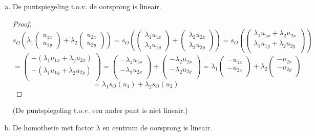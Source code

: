 \documentclass[lineaire_algebra_oplossingen.tex]{subfiles}
\begin{document}
\begin{enumerate}
\begin{enumerate}[a)]
\item De puntspiegeling t.o.v. de oorsprong is lineair.
\begin{proof}
\[
s_O \left(\lambda_1
\begin{pmatrix}
u_{1x}\\u_{1y}
\end{pmatrix} 
+ \lambda_2
\begin{pmatrix}
u_{2x}\\u_{2y}
\end{pmatrix} \right)
 = 
s_O \left(
\begin{pmatrix}
\lambda_1u_{1x}\\\lambda_1u_{1y}
\end{pmatrix} 
+ 
\begin{pmatrix}
\lambda_2u_{2x}\\\lambda_2u_{2y}
\end{pmatrix} \right)
=
s_O \left(
\begin{pmatrix}
\lambda_1u_{1x}+\lambda_2u_{2x}\\\lambda_1u_{1y}+\lambda_2u_{2y}\\
\end{pmatrix} \right)
\]
\[
= 
\begin{pmatrix}
-(\lambda_1u_{1x}+\lambda_2u_{2x})\\-(\lambda_1u_{1y}+\lambda_2u_{2y})\\
\end{pmatrix} 
=
\begin{pmatrix}
-\lambda_1u_{1x}\\-\lambda_2u_{2x}\\
\end{pmatrix}
+
\begin{pmatrix}
-\lambda_2u_{2x}\\-\lambda_2u_{2y}\\
\end{pmatrix}
=
\lambda_1
\begin{pmatrix}
-u_{1x}\\-u_{2x}\\
\end{pmatrix}
+
\lambda_2
\begin{pmatrix}
-u_{2x}\\-u_{2y}\\
\end{pmatrix}
\]
\[
=
\lambda_1s_O(u_1) + \lambda_2s_O(u_2)
\]
\end{proof}
(De puntspiegeling t.o.v. een ander punt is niet lineair.)
\item De homothetie met factor $\lambda$ en centrum de oorsprong is lineair.

\end{enumerate}
\end{enumerate}
\end{document}
